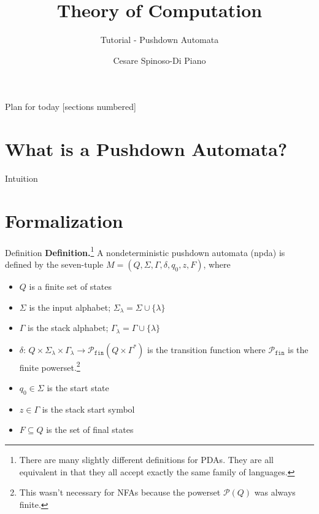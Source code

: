 \documentclass[10pt]{beamer}
\title{Theory of Computation}
\subtitle{Tutorial - Pushdown Automata}
\author{Cesare Spinoso-Di Piano}
\date{}
\begin{document}
\maketitle

\begin{frame}{Plan for today}
    [sections numbered]
    \tableofcontents[hideallsubsections]
\end{frame}

\section{What is a Pushdown Automata?}

\begin{frame}{Intuition}

\end{frame}

\section{Formalization}

\begin{frame}{Definition}
    \textbf{Definition.}\footnote{There are many slightly different definitions for PDAs. They are all equivalent in that they all accept exactly the same family of languages.} A nondeterministic pushdown automata (npda) is defined by the seven-tuple $M = (Q, \Sigma, \Gamma, \delta, q_0, z, F)$, where
    \begin{itemize}
        \item $Q$ is a finite set of states
        \item $\Sigma$ is the input alphabet; $\Sigma_\lambda = \Sigma \cup \{\lambda\}$
        \item $\Gamma$ is the stack alphabet; $\Gamma_\lambda = \Gamma \cup \{\lambda\}$
        \item $\delta$: $Q \times \Sigma_\lambda \times \Gamma_\lambda \rightarrow \mathcal{P}_{\texttt{fin}}(Q \times \Gamma^*)$ is the transition function where $\mathcal{P}_{\texttt{fin}}$ is the finite powerset.\footnote{This wasn't necessary for NFAs because the powerset $\mathcal{P}(Q)$ was always finite.}
        \item $q_0\in\Sigma$ is the start state
        \item $z\in\Gamma$ is the stack start symbol
        \item $F \subseteq Q$ is the set of final states
    \end{itemize}
\end{frame}
\end{document}

